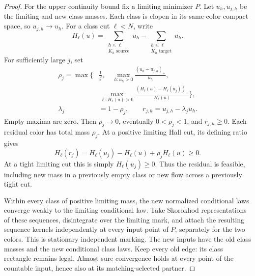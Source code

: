 \documentclass[11pt,reqno]{amsart}
\theoremstyle{definition}
\theoremstyle{remark}
\numberwithin{equation}{section}
\begin{document}
\begin{proof}
For the upper continuity bound fix a limiting minimizer \(P\).
Let \(u_h,u_{j,h}\) be the limiting and new class masses. Each
class is clopen in its same-color compact space, so \(u_{j,h}\to u_h\).
For a class cut \(\ell<N\), write
\[
 H_\ell(u)=\sum_{\substack{h\le\ell\\K_h\text{ source}}}u_h
           -\sum_{\substack{h\le\ell\\K_h\text{ target}}}u_h.
\]
For sufficiently large \(j\), set
\begin{equation}
\label{eq:forward-weak-residual}
\begin{aligned}
 \rho_j=\max\bigg\{&\frac1j,\quad
    \max_{h:u_h>0}\frac{(u_h-u_{j,h})_+}{u_h},\\
 &\max_{\ell:H_\ell(u)>0}
       \frac{(H_\ell(u)-H_\ell(u_j))_+}{H_\ell(u)}\bigg\},\\
 \lambda_j&=1-\rho_j,\qquad r_{j,h}=u_{j,h}-\lambda_j u_h.
\end{aligned}
\end{equation}
Empty maxima are zero. Then \(\rho_j\to0\), eventually
\(0<\rho_j<1\), and \(r_{j,h}\ge0\). Each residual color has
total mass \(\rho_j\). At a positive limiting Hall cut, its defining
ratio gives
\[
 H_\ell(r_j)=H_\ell(u_j)-H_\ell(u)+\rho_jH_\ell(u)\ge0.
\]
At a tight limiting cut this is simply \(H_\ell(u_j)\ge0\).
Thus the residual is feasible, including new mass in a previously
empty class or new flow across a previously tight cut.

Within every class of positive limiting mass, the new normalized
conditional laws converge weakly to the limiting conditional law.
Take Skorokhod representations of these sequences, disintegrate
over the limiting mark, and attach the resulting sequence kernels
independently at every input point of \(P\), separately for the two
colors. This is stationary independent marking. The new inputs have
the old class masses and the new conditional class laws. Keep every
old edge: its class rectangle remains legal. Almost sure convergence
holds at every point of the countable input, hence also at its
matching-selected partner.


\end{proof}
\end{document}
